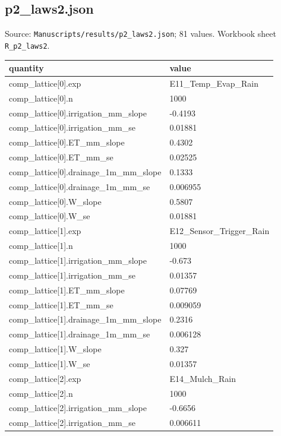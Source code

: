 \subsection*{p2\_laws2.json}
\noindent\small Source: \nolinkurl{Manuscripts/results/p2_laws2.json}; 81 values. Workbook sheet \texttt{R\_p2\_laws2}.\par
{\scriptsize\begin{longtable}{p{}p{}}\toprule\textbf{quantity} & \textbf{value}\\\midrule\endhead
{}comp\_lattice[0].exp & E11\_Temp\_Evap\_Rain\\
{}comp\_lattice[0].n & 1000\\
{}comp\_lattice[0].irrigation\_mm\_slope & -0.4193\\
{}comp\_lattice[0].irrigation\_mm\_se & 0.01881\\
{}comp\_lattice[0].ET\_mm\_slope & 0.4302\\
{}comp\_lattice[0].ET\_mm\_se & 0.02525\\
{}comp\_lattice[0].drainage\_1m\_mm\_slope & 0.1333\\
{}comp\_lattice[0].drainage\_1m\_mm\_se & 0.006955\\
{}comp\_lattice[0].W\_slope & 0.5807\\
{}comp\_lattice[0].W\_se & 0.01881\\
{}comp\_lattice[1].exp & E12\_Sensor\_Trigger\_Rain\\
{}comp\_lattice[1].n & 1000\\
{}comp\_lattice[1].irrigation\_mm\_slope & -0.673\\
{}comp\_lattice[1].irrigation\_mm\_se & 0.01357\\
{}comp\_lattice[1].ET\_mm\_slope & 0.07769\\
{}comp\_lattice[1].ET\_mm\_se & 0.009059\\
{}comp\_lattice[1].drainage\_1m\_mm\_slope & 0.2316\\
{}comp\_lattice[1].drainage\_1m\_mm\_se & 0.006128\\
{}comp\_lattice[1].W\_slope & 0.327\\
{}comp\_lattice[1].W\_se & 0.01357\\
{}comp\_lattice[2].exp & E14\_Mulch\_Rain\\
{}comp\_lattice[2].n & 1000\\
{}comp\_lattice[2].irrigation\_mm\_slope & -0.6656\\
{}comp\_lattice[2].irrigation\_mm\_se & 0.006611\\

\end{longtable}}
